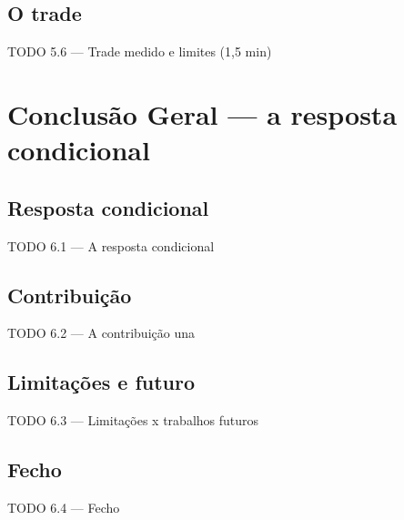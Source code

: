 \documentclass{beamer}
\begin{document}
\subsection{O trade}
\begin{frame}{TODO 5.6 --- Trade medido e limites (1,5 min)}
\end{frame}


\section[Conclusão]{Conclusão Geral --- a resposta condicional}                    %

\subsection{Resposta condicional}
\begin{frame}{TODO 6.1 --- A resposta condicional}
\end{frame}

\subsection{Contribuição}
\begin{frame}{TODO 6.2 --- A contribuição una}
\end{frame}

\subsection{Limitações e futuro}
\begin{frame}{TODO 6.3 --- Limitações x trabalhos futuros}
\end{frame}

\subsection{Fecho}
{
\specialframe
\begin{frame}{TODO 6.4 --- Fecho}
\end{frame}
}
\end{document}
